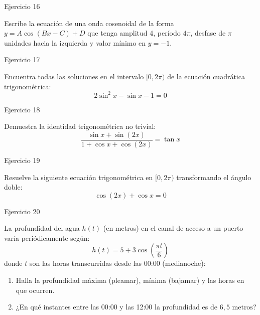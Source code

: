 \documentclass[aspectratio=169]{beamer}
\begin{document}
\begin{frame}{Ejercicio 16}
  \begin{mwejercicio}
    Escribe la ecuación de una onda cosenoidal de la forma $y = A\cos(Bx - C) + D$ que tenga amplitud 4, período $4\pi$, desfase de $\pi$ unidades hacia la izquierda y valor mínimo en $y = -1$.
  \end{mwejercicio}
  \vspace{3.5cm}
\end{frame}
\begin{frame}{Ejercicio 17}
  \begin{mwejercicio}
    Encuentra todas las soluciones en el intervalo $[0, 2\pi)$ de la ecuación cuadrática trigonométrica:
    $$2\sin^2 x - \sin x - 1 = 0$$
  \end{mwejercicio}
  \vspace{3.5cm}
\end{frame}
\begin{frame}{Ejercicio 18}
  \begin{mwejercicio}
    Demuestra la identidad trigonométrica no trivial:
    $$\frac{\sin x + \sin(2x)}{1 + \cos x + \cos(2x)} = \tan x$$
  \end{mwejercicio}
  \vspace{3.5cm}
\end{frame}
\begin{frame}{Ejercicio 19}
  \begin{mwejercicio}
    Resuelve la siguiente ecuación trigonométrica en $[0, 2\pi)$ transformando el ángulo doble:
    $$\cos(2x) + \cos x = 0$$
  \end{mwejercicio}
  \vspace{3.5cm}
\end{frame}
\begin{frame}{Ejercicio 20}
  \begin{mwejercicio}
    La profundidad del agua $h(t)$ (en metros) en el canal de acceso a un puerto varía periódicamente según:
    $$h(t) = 5 + 3\cos\left(\frac{\pi t}{6}\right)$$
    donde $t$ son las horas transcurridas desde las 00:00 (medianoche):
    \begin{enumerate}
      \item Halla la profundidad máxima (pleamar), mínima (bajamar) y las horas en que ocurren.
      \item ¿En qué instantes entre las 00:00 y las 12:00 la profundidad es de $6{,}5\text{ metros}$?
    \end{enumerate}
  \end{mwejercicio}
  \vspace{2.5cm}
\end{frame}
\end{document}
